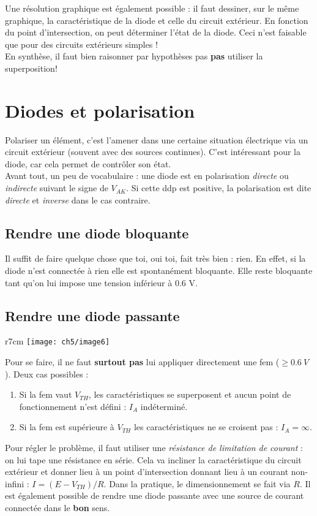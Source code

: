 		Une résolution graphique est également possible : il faut dessiner, sur le 
		même graphique, la caractéristique de la diode et celle du circuit extérieur. 
		En fonction du point d'intersection, on peut déterminer l'état de la diode. 
		Ceci n'est faisable que pour des circuits extérieurs simples !\\
		\danger En synthèse, il faut bien raisonner par hypothèses pas \textbf{pas} 
		utiliser la superposition!
			
			
	\section{Diodes et polarisation}
	Polariser un élément, c'est l'amener dans une certaine situation électrique via un 
	circuit extérieur (souvent avec des sources continues). C'est intéressant pour 
	la diode, car cela permet de contrôler son état.\\
	
	Avant tout, un peu de vocabulaire : une diode est en polarisation \textit{directe }
	ou \textit{indirecte} suivant le signe de $V_{AK}$. Si cette ddp est positive, la 
	polarisation est dite \textit{directe} et \textit{inverse} dans le cas contraire.
	
		\subsection{Rendre une diode bloquante}
		Il suffit de faire quelque chose que toi, oui toi, fait très bien : rien. En 
		effet, si la diode n'est connectée à rien elle est spontanément bloquante. 
		Elle reste bloquante tant qu'on lui impose une tension inférieur à 0.6 V.
			
		\subsection{Rendre une diode passante}
		\begin{wrapfigure}[8]{r}{7cm}
		\vspace{-0.5cm}
		\texttt{[image: ch5/image6]}
		\end{wrapfigure}
		Pour se faire, il ne faut \textbf{surtout pas} lui appliquer directement une 
		fem ($\geq 0.6\ V$). Deux cas possibles :
		\begin{enumerate}
		\item Si la fem vaut $V_{TH}$, les caractéristiques se superposent et aucun 
		point de fonctionnement n'est défini : $I_A$ indéterminé.
		\item Si la fem est supérieure à $V_{TH}$ les caractéristiques ne se croisent 
		pas : $I_A = \infty$.
		\end{enumerate}
		Pour régler le problème, il faut utiliser une \textit{résistance de limitation 
		de courant} : on lui tape une résistance en série. Cela va incliner la 
		caractéristique du circuit extérieur et donner lieu à un point d'intersection 
		donnant lieu à un courant non-infini : $I = (E-V_{TH})/R$. Dans la pratique, 
		le dimensionnement se fait via $R$. Il est également possible de rendre une 
		diode passante avec une source de courant connectée dans le \textbf{bon} sens.
		
